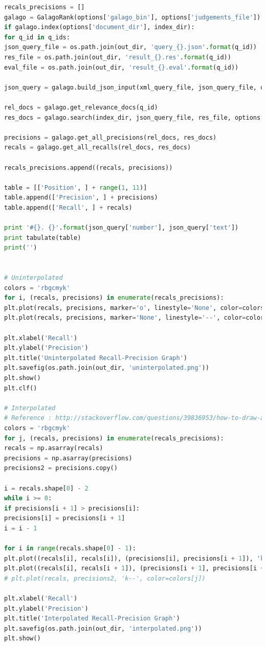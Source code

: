 \documentclass[letterpaper,11pt]{article}
\begin{document}
\begin{lstlisting}[language=python, caption={Code for question 8.4}, label={lst:84}]
recals_precisions = []
galago = GalagoRank(options['galago_bin'], options['judgements_file'])
if galago.index(options['document_dir'], index_dir):
for q_id in q_ids:
json_query_file = os.path.join(out_dir, 'query_{}.json'.format(q_id))
res_file = os.path.join(out_dir, 'result_{}.res'.format(q_id))
eval_file = os.path.join(out_dir, 'result_{}.eval'.format(q_id))

json_query = galago.build_json_input(xml_query_file, json_query_file, q_id)

rel_docs = galago.get_relevance_docs(q_id)
res_docs = galago.search(index_dir, json_query_file, res_file, options['result_count'])

precisions = galago.get_all_precisions(rel_docs, res_docs)
recals = galago.get_all_recalls(rel_docs, res_docs)

recals_precisions.append((recals, precisions))

table = [['Position', ] + range(1, 11)]
table.append(['Precision', ] + precisions)
table.append(['Recall', ] + recals)

print '#{}. {}'.format(json_query['number'], json_query['text'])
print tabulate(table)
print('')


# Uninterpolated
colors = 'rbgcmyk'
for i, (recals, precisions) in enumerate(recals_precisions):
plt.plot(recals, precisions, marker='o', linestyle='None', color=colors[i])
plt.plot(recals, precisions, marker='None', linestyle='--', color=colors[i])

plt.xlabel('Recall')
plt.ylabel('Precision')
plt.title('Uninterpolated Recall-Precision Graph')
plt.savefig(os.path.join(out_dir, 'uninterpolated.png'))
plt.show()
plt.clf()

# Interpolated
# Reference : http://stackoverflow.com/questions/39836953/how-to-draw-a-precision-recall-curve-with-interpolation-in-python
colors = 'rbgcmyk'
for j, (recals, precisions) in enumerate(recals_precisions):
recals = np.asarray(recals)
precisions = np.asarray(precisions)
precisions2 = precisions.copy()

i = recals.shape[0] - 2
while i >= 0:
if precisions[i + 1] > precisions[i]:
precisions[i] = precisions[i + 1]
i = i - 1

for i in range(recals.shape[0] - 1):
plt.plot((recals[i], recals[i]), (precisions[i], precisions[i + 1]), 'k-', label='', color=colors[j])  # vertical
plt.plot((recals[i], recals[i + 1]), (precisions[i + 1], precisions[i + 1]), 'k-', label='', color=colors[j])  # horizontal
# plt.plot(recals, precisions2, 'k--', color=colors[j])

plt.xlabel('Recall')
plt.ylabel('Precision')
plt.title('Interpolated Recall-Precision Graph')
plt.savefig(os.path.join(out_dir, 'interpolated.png'))
plt.show()


\end{lstlisting}
\end{document}
